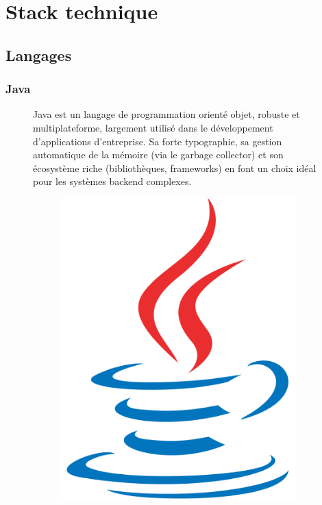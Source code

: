\documentclass[12pt,a4paper]{report}
\begin{document}
	\section{Stack technique}
	
	\subsection{Langages}
	
	\subsubsection{Java}
	
	\begin{figure}[H]
		\begin{minipage}{0.8\textwidth}
			Java est un langage de programmation orienté objet, robuste et multiplateforme, largement utilisé dans le développement d'applications d'entreprise. Sa forte typographie, sa gestion automatique de la mémoire (via le garbage collector) et son écosystème riche (bibliothèques, frameworks) en font un choix idéal pour les systèmes backend complexes.
		\end{minipage}
		\hfill
		\begin{minipage}{0.15\textwidth}
			\begin{figure}[H]
				\centering
				\includegraphics[width=\linewidth]{java-logo.png}
				\label{fig:java-logo}
			\end{figure}			
		\end{minipage}
	\end{figure}
	
\end{document}

